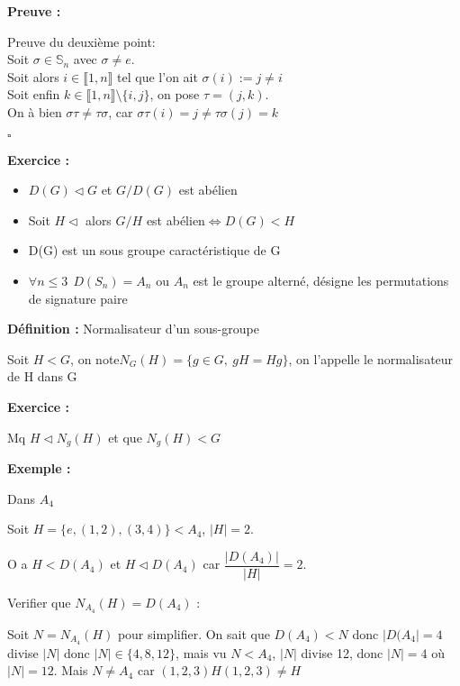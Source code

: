 \documentclass{report}
\renewenvironment{leftbar}{%
  \def\FrameCommand{\vrule width 0.4pt \hspace{10pt}}%
  \MakeFramed {\advance\hsize-\width \FrameRestore}}%
 {\endMakeFramed}%
\newenvironment{definition}[1][]{
    \begin{tcolorbox}[colframe= white]
    \textbf{Définition :} 
    #1 \par
    }
    {\end{tcolorbox}}
\newenvironment{preuve}{\vspace*{0.5cm}
    \begin{leftbar}
    \noindent\textbf{Preuve :}\par}{
    \begin{flushright}
    $\square$
    \end{flushright}
    \end{leftbar}
}
\newenvironment{exemple}{\begin{tcolorbox}[colback=gray!10,colframe= white]
    \textbf{Exemple :}
     \par}
    {\end{tcolorbox}}
\newenvironment{exo}{\begin{tcolorbox}[colframe= white]
    \textbf{Exercice :}
    \par}
    {\end{tcolorbox}}
\newcommand{\sn}{\mathbb{S}_n}
\begin{document}
\begin{preuve}
    Preuve du deuxième point:\\
    Soit $\sigma \in \sn$ avec $\sigma \neq e$.\\
    Soit alors $i\in \llbracket 1,n \rrbracket$ tel que l'on ait $\sigma(i):=j\neq i$\\
    Soit enfin $k\in \llbracket 1,n \rrbracket \setminus \{i,j\}$, on pose $\tau = (j,k)$.\\
    On à bien $\sigma\tau\neq\tau\sigma$, car $\sigma\tau(i)=j\neq\tau\sigma(j)=k$
\end{preuve}


\begin{exo}
    \begin{itemize}
        \item $D(G)\vartriangleleft G$ et $G/D(G)$ est abélien
        \item Soit $H \vartriangleleft$ alors $G/H$ est abélien$\Leftrightarrow D(G)<H$
        \item D(G) est un sous groupe caractéristique de G
        \item $\forall n \leq3 ~~D(S_{n})=A_{n}$ ou $A_{n}$ est le groupe alterné, désigne les permutations de signature paire
    \end{itemize}
\end{exo}

\begin{definition}[Normalisateur d'un sous-groupe]
Soit $H<G$, on note$N_{G}(H) = \{g\in G , ~gH=Hg\}$, on l'appelle le normalisateur de H dans G
\end{definition}

\begin{exo}
Mq $H\triangleleft N_{g}(H)$ et que $N_{g}(H)<G$
\end{exo}

\begin{exemple}
Dans $A_{4}$ \par
Soit $H =\{ e,(1,2),(3,4) \}<A_{4}$, $|H|=2$.  \par
O a $H<D(A_{4})$ et $H\triangleleft D(A_{4})$ car $\dfrac{|D(A_{4})|}{|H|}=2$.  \par
Verifier que $N_{A_{4}}(H)=D(A_{4})$ :  \par

Soit $N = N_{A_{4}}(H)$ pour simplifier. On sait que $D(A_{4})<N$ donc $|D(A_{4}|=4$ divise $|N|$ donc $|N|\in \{ 4,8,12 \}$, mais vu $N<A_{4}$, $|N|$ divise 12, donc $|N|=4$ où $|N|=12$. Mais $N\neq A_{4}$ car $(1,2,3)H(1,2,3)\neq H$  \par
\end{exemple}
\end{document}
